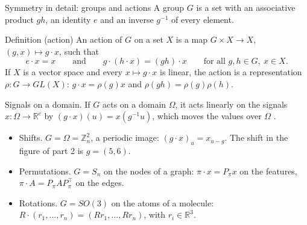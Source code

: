 \documentclass[10pt]{beamer}
\newcommand{\R}{\mathbb{R}}
\begin{document}
\begin{frame}{Symmetry in detail: groups and actions}
\footnotesize
A \alert{group} $G$ is a set with an associative product $gh$, an identity $e$ and an inverse $g^{-1}$ of every element.
\begin{mathbox}{Definition (action)}
An \alert{action} of $G$ on a set $X$ is a map $G\times X\to X$, $(g,x)\mapsto g\cdot x$, such that
\[
e\cdot x=x\qquad\text{and}\qquad g\cdot(h\cdot x)=(gh)\cdot x\qquad\text{for all }g,h\in G,\ x\in X.
\]
If $X$ is a vector space and every $x\mapsto g\cdot x$ is linear, the action is a \alert{representation} $\rho:G\to GL(X)$: $g\cdot x=\rho(g)x$ and $\rho(gh)=\rho(g)\rho(h)$.
\end{mathbox}
\alert{Signals on a domain.} If $G$ acts on a domain $\Omega$, it acts linearly on the signals $x:\Omega\to\R^c$ by $(g\cdot x)(u)=x(g^{-1}u)$, which moves the values over $\Omega$ \citep{bronstein2021}.
\begin{itemize}
\item \alert{Shifts.} $G=\Omega=\mathbb Z_n^2$, a periodic image: $(g\cdot x)_u=x_{u-g}$. The shift in the figure of part 2 is $g=(5,6)$.
\item \alert{Permutations.} $G=S_n$ on the nodes of a graph: $\pi\cdot x=P_\pi x$ on the features, $\pi\cdot A=P_\pi AP_\pi^\top$ on the edges.
\item \alert{Rotations.} $G=SO(3)$ on the atoms of a molecule: $R\cdot(r_1,\dots,r_n)=(Rr_1,\dots,Rr_n)$, with $r_i\in\R^3$.
\end{itemize}
\end{frame}
\end{document}
